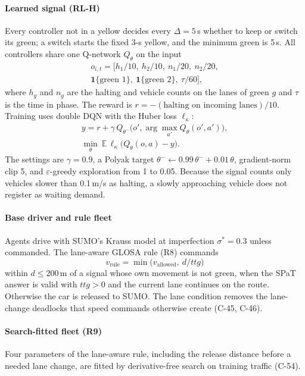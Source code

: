 \paragraph{Learned signal (RL-H)} Every controller not in a yellow decides every $\Delta=5$\,s whether to keep or switch its green; a
switch starts the fixed 3-s yellow, and the minimum green is 5\,s. All controllers share one Q-network $Q_\theta$ on the input
\begin{multline}
o_{i,t}=\big[h_1/10,\ h_2/10,\ n_1/20,\ n_2/20,\\ \mathbf{1}\{\text{green }1\},\ \mathbf{1}\{\text{green }2\},\ \tau/60\big],
\end{multline}
where $h_g$ and $n_g$ are the halting and vehicle counts on the lanes of green $g$ and $\tau$ is the time in phase. The reward is
$r=-(\text{halting on incoming lanes})/10$. Training uses double DQN with the Huber loss $\ell_\kappa$:
\begin{gather}
y=r+\gamma\,Q_{\theta^-}\!\big(o',\arg\max_{a'}Q_\theta(o',a')\big),\\
\min_\theta\ \mathbb E\,\ell_\kappa\big(Q_\theta(o,a)-y\big).
\end{gather}
The settings are $\gamma=0.9$, a Polyak target $\theta^-\leftarrow0.99\,\theta^-+0.01\,\theta$, gradient-norm clip 5, and $\varepsilon$-greedy
exploration from 1 to 0.05. Because the signal counts only vehicles slower than 0.1\,m/s as halting, a slowly approaching vehicle does not
register as waiting demand.
\paragraph{Base driver and rule fleet} Agents drive with SUMO's Krauss model at imperfection $\sigma^*=0.3$ unless commanded. The
lane-aware GLOSA rule (R8) commands
\begin{equation}
v_{\mathrm{rule}}=\min\big(v_{\mathrm{allowed}},\ d/\mathit{ttg}\big)
\end{equation}
within $d\le200$\,m of a signal whose own movement is not green, when the SPaT answer is valid with $\mathit{ttg}>0$ and the current lane
continues on the route. Otherwise the car is released to SUMO. The lane condition removes the lane-change deadlocks that speed commands
otherwise create (C-45, C-46).
\paragraph{Search-fitted fleet (R9)} Four parameters of the lane-aware rule, including the release distance before a needed lane change,
are fitted by derivative-free search on training traffic (C-54).
